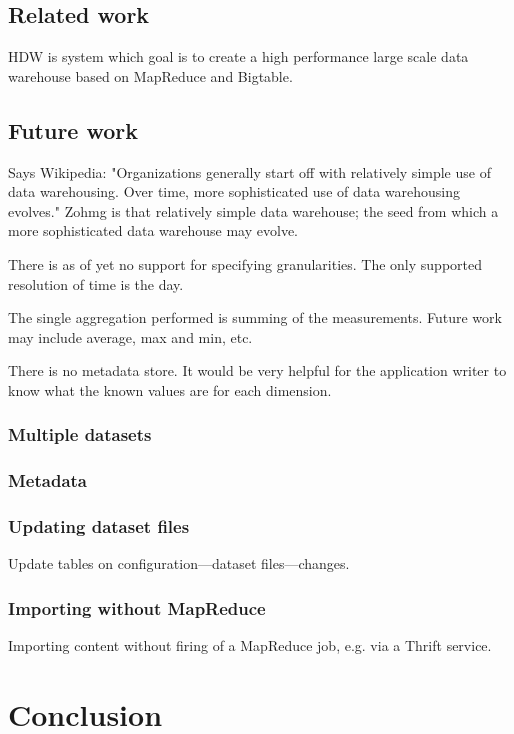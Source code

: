 \documentclass[a4paper,10pt]{book}
\begin{document}
\section{Related work}

HDW is system which goal is to create a high performance large scale data
warehouse based on MapReduce and Bigtable. \cite{hdw}



\section{Future work}

Says Wikipedia: "Organizations generally start off with relatively simple use of data warehousing. Over time, more sophisticated use of data warehousing evolves." Zohmg is that relatively simple data warehouse; the seed from which a more sophisticated data warehouse may evolve.

There is as of yet no support for specifying granularities. The only supported resolution of time is the day.

The single aggregation performed is summing of the measurements. Future work may include average, max and min, etc.

There is no metadata store. It would be very helpful for the application writer to know what the known values are for each dimension.

\subsection{Multiple datasets}

\subsection{Metadata}

\subsection{Updating dataset files}

Update tables on configuration---dataset files---changes.

\subsection{Importing without MapReduce}

Importing content without firing of a MapReduce job, e.g. via a Thrift
service.



\chapter{Conclusion}



\pagebreak



 
\end{document}
